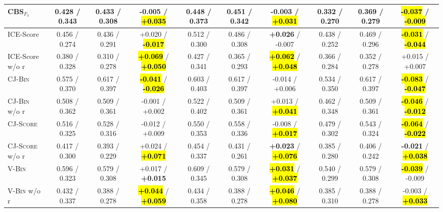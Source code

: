 \begin{table}[t]
\begin{tabular}{@{}
        l|ccc|ccc|ccc@{}}
        CBS$_{F_3}$             & 0.428 / 0.343   & 0.433 / 0.308   & -0.005 / \hl{\textbf{+0.035}}       & 0.448 / 0.373   & 0.451 / 0.342   & -0.003 / \hl{\textbf{+0.031}}       & 0.332 / 0.270   & 0.369 / 0.279   & \hl{\textbf{-0.037}} / \hl{\textbf{-0.009}} \\
        \midrule
        \midrule
        ICE-Score               & 0.456 / 0.274   & 0.436 / 0.291   & +0.020 / \hl{\textbf{-0.017}}       & 0.512 / 0.300   & 0.486 / 0.308   & \textbf{+0.026} / -0.007            & 0.438 / 0.252   & 0.469 / 0.296   & \hl{\textbf{-0.031}} / \hl{\textbf{-0.044}} \\
        ICE-Score w/o r         & 0.380 / 0.328   & 0.310 / 0.278   & \hl{\textbf{+0.069}} / \hl{\textbf{+0.050}} & 0.427 / 0.341   & 0.365 / 0.293   & \hl{\textbf{+0.062}} / \hl{\textbf{+0.048}} & 0.366 / 0.284   & 0.352 / 0.278   & +0.015 / +0.007                     \\
        \midrule
        \textsc{CJ-Bin}         & 0.575 / 0.370   & 0.617 / 0.397   & \hl{\textbf{-0.041}} / \hl{\textbf{-0.026}} & 0.603 / 0.403   & 0.617 / 0.397   & -0.014 / +0.006                     & 0.534 / 0.350   & 0.617 / 0.397   & \hl{\textbf{-0.083}} / \hl{\textbf{-0.047}} \\
        \textsc{CJ-Bin} w/o r   & 0.508 / 0.362   & 0.509 / 0.361   & -0.001 / +0.002                     & 0.522 / 0.402   & 0.509 / 0.361   & +0.013 / \hl{\textbf{+0.041}}       & 0.462 / 0.348   & 0.509 / 0.361   & \hl{\textbf{-0.046}} / \hl{\textbf{-0.012}} \\
        \midrule
        \textsc{CJ-Score}       & 0.516 / 0.325   & 0.528 / 0.316   & -0.012 / +0.009                     & 0.550 / 0.353   & 0.558 / 0.336   & -0.008 / \hl{\textbf{+0.017}}       & 0.479 / 0.302   & 0.543 / 0.324   & \hl{\textbf{-0.064}} / \hl{\textbf{-0.022}} \\
        \textsc{CJ-Score} w/o r & 0.417 / 0.300   & 0.393 / 0.229   & +0.024 / \hl{\textbf{+0.071}}       & 0.454 / 0.337   & 0.431 / 0.261   & \textbf{+0.023} / \hl{\textbf{+0.076}} & 0.385 / 0.280   & 0.406 / 0.242   & \textbf{-0.021} / \hl{\textbf{+0.038}} \\
        \midrule
        \textsc{V-Bin}          & 0.596 / 0.323   & 0.579 / 0.308   & +0.017 / \textbf{+0.015}            & 0.609 / 0.345   & 0.579 / 0.308   & \hl{\textbf{+0.031}} / \hl{\textbf{+0.037}} & 0.540 / 0.299   & 0.579 / 0.308   & \hl{\textbf{-0.039}} / -0.009       \\
        \textsc{V-Bin} w/o r    & 0.432 / 0.337   & 0.388 / 0.278   & \hl{\textbf{+0.044}} / \hl{\textbf{+0.059}} & 0.434 / 0.358   & 0.388 / 0.278   & \hl{\textbf{+0.046}} / \hl{\textbf{+0.080}} & 0.385 / 0.310   & 0.388 / 0.278   & -0.003 / \hl{\textbf{+0.033}}       \\

\end{tabular}
\end{table}
